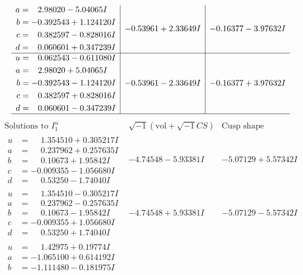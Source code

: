 \documentclass[1p]{elsarticle_modified}
\theoremstyle{definition}
\newcommand{\I}{\sqrt{-1}}
\begin{document}
$$\begin{array}{c|c|c}
\begin{aligned}
a &= \phantom{-}2.98020 - 5.04065 I \\
b &= -0.392543 + 1.124120 I \\
c &= \phantom{-}0.382597 - 0.828016 I \\
d &= \phantom{-}0.060601 + 0.347239 I\end{aligned}
 & -0.53961 + 2.33649 I & -0.16377 - 3.97632 I \\ \hline\begin{aligned}
u &= \phantom{-}0.062543 - 0.611080 I \\
a &= \phantom{-}2.98020 + 5.04065 I \\
b &= -0.392543 - 1.124120 I \\
c &= \phantom{-}0.382597 + 0.828016 I \\
d &= \phantom{-}0.060601 - 0.347239 I\end{aligned}
 & -0.53961 - 2.33649 I & -0.16377 + 3.97632 I\\
 \hline 
 \end{array}$$\newpage$$\begin{array}{c|c|c}  
\text{Solutions to }I^u_{1}& \I (\text{vol} + \sqrt{-1}CS) & \text{Cusp shape}\\
 \hline 
\begin{aligned}
u &= \phantom{-}1.354510 + 0.305217 I \\
a &= \phantom{-}0.237962 + 0.257635 I \\
b &= \phantom{-}0.10673 + 1.95842 I \\
c &= -0.009355 - 1.056680 I \\
d &= \phantom{-}0.53250 - 1.74040 I\end{aligned}
 & -4.74548 - 5.93381 I & -5.07129 + 5.57342 I \\ \hline\begin{aligned}
u &= \phantom{-}1.354510 - 0.305217 I \\
a &= \phantom{-}0.237962 - 0.257635 I \\
b &= \phantom{-}0.10673 - 1.95842 I \\
c &= -0.009355 + 1.056680 I \\
d &= \phantom{-}0.53250 + 1.74040 I\end{aligned}
 & -4.74548 + 5.93381 I & -5.07129 - 5.57342 I \\ \hline\begin{aligned}
u &= \phantom{-}1.42975 + 0.19774 I \\
a &= -1.065100 + 0.614192 I \\
b &= -1.111480 - 0.181975 I \\

\end{aligned}
\end{array}$$
\end{document}
